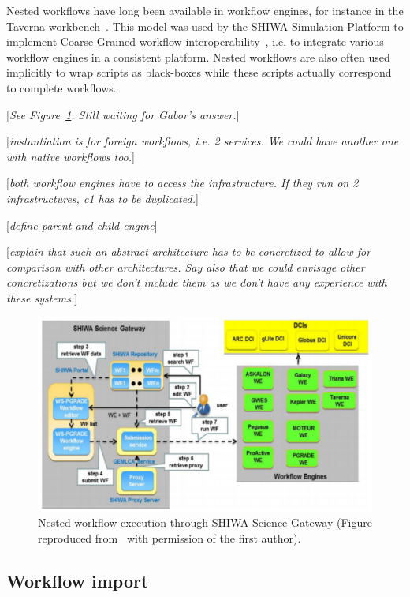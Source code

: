 \documentclass[preprint,3p,twocolumn]{elsarticle}
\newcommand{\todo}[1]{\color{blue}\xspace[\emph{#1}]\xspace\color{black}}
\begin{document}
Nested workflows have long been available in workflow engines, for
instance in the Taverna workbench~\cite{oinn2004taverna}. This model
was used by the SHIWA Simulation Platform to implement Coarse-Grained
workflow interoperability~\cite{terstyanszky2014enabling}, i.e. to
integrate various workflow engines in a consistent platform. Nested
workflows are also often used implicitly to wrap scripts as
black-boxes while these scripts actually correspond to complete workflows.

\todo{See Figure~\ref{fig:shiwa-architecture}. Still waiting for Gabor's answer.}

\todo{instantiation is for foreign workflows, i.e. 2 services. We could have another one with native workflows too.}

\todo{both workflow engines have to access the infrastructure. If they
  run on 2 infrastructures, c1 has to be duplicated.}

\todo{define parent and child engine}

\todo{explain that such an abstract architecture has to be concretized to allow for comparison with other architectures. Say also that we could envisage other concretizations but we don't include them as we don't have any experience with these systems.} 



\begin{figure}
\centering
\includegraphics[width=1.5\columnwidth]{figures/shiwa-science-gateway.pdf}
\caption{Nested workflow execution through SHIWA Science Gateway
  (Figure reproduced from~\cite{terstyanszky2014enabling} with
  permission of the first author).}
\label{fig:shiwa-architecture}
\end{figure}

\subsection{Workflow import}
\end{document}
